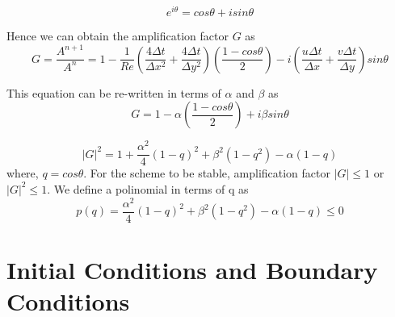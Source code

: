 \documentclass{article}
\begin{document}
\begin{equation}
e^{i\theta} = cos \theta +isin \theta
\end{equation}

Hence we can obtain the amplification factor $G$ as 
\begin{equation}
G = \frac{A^{n+1}}{A^n} = 1-\frac{1}{Re}\left(\frac{4\Delta t }{\Delta x^2}+\frac{4\Delta t}{\Delta y^2}\right)\left(\frac{1-cos\theta}{2}\right) - i\left(\frac{u\Delta t}{\Delta x}+\frac{v\Delta t }{\Delta y}\right)sin\theta
\end{equation}

This equation can be re-written in terms of $\alpha$ and $\beta$ as
 \begin{equation}
G = 1-\alpha \left(\frac{1-cos\theta}{2} \right)+i\beta sin\theta
\end{equation}

 \begin{equation}
|G|^2 = 1+\frac{\alpha^2}{4} (1-q)^2+\beta^2 (1-q^2) -\alpha (1-q)
\end{equation}
where, $q=cos\theta$. For the scheme to be stable, amplification factor $|G| \leq 1$ or $|G|^2 \leq 1$. We define a polinomial in terms of q as 
 \begin{equation}
p(q)= \frac{\alpha^2}{4} (1-q)^2+\beta^2 (1-q^2) -\alpha (1-q)  \leq 0
\end{equation}



\section{Initial Conditions and Boundary Conditions}
\end{document}
